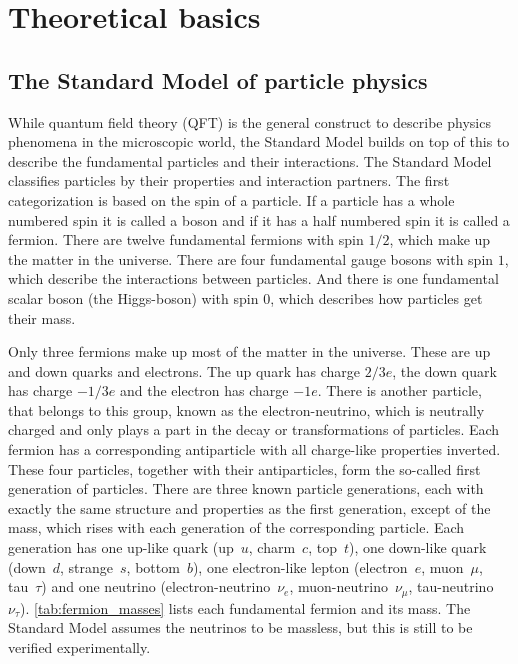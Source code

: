 \chapter{Theoretical basics}


\section{The Standard Model of particle physics}

While quantum field theory (QFT) is the general construct to describe physics phenomena in the microscopic world, the Standard Model builds on top of this to describe the fundamental particles and their interactions.
The Standard Model classifies particles by their properties and interaction partners. 
The first categorization is based on the spin of a particle. If a particle has a whole numbered spin it is called a boson and if it has a half numbered spin it is called a fermion.
There are twelve fundamental fermions with spin $1/2$, which make up the matter in the universe.
There are four fundamental gauge bosons with spin $1$, which describe the interactions between particles. 
And there is one fundamental scalar boson (the Higgs-boson) with spin $0$, which describes how particles get their mass.

Only three fermions make up most of the matter in the universe. These are up and down quarks and electrons.
The up quark has charge $2/3e$, the down quark has charge $-1/3e$ and the electron has charge $-1e$.
There is another particle, that belongs to this group, known as the electron-neutrino, which is neutrally charged and only plays a part in the decay or transformations of particles.
Each fermion has a corresponding antiparticle with all charge-like properties inverted.
These four particles, together with their antiparticles, form the so-called first generation of particles.
There are three known particle generations, each with exactly the same structure and properties as the first generation, except of the mass, which rises with each generation of the corresponding particle.
Each generation has one up-like quark (up~$u$, charm~$c$, top~$t$), one down-like quark (down~$d$, strange~$s$, bottom~$b$), one electron-like lepton (electron~$e$, muon~$\mu$, tau~$\tau$) and one neutrino (electron-neutrino~$\nu_e$, muon-neutrino~$\nu_\mu$, tau-neutrino~$\nu_\tau$).
\autoref{tab:fermion_masses} lists each fundamental fermion and its mass.
The Standard Model assumes the neutrinos to be massless, but this is still to be verified experimentally.


